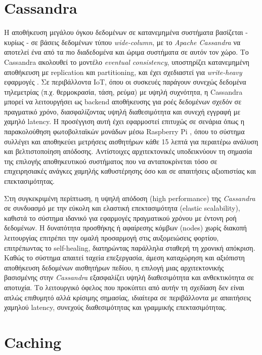 \section{Cassandra}

Η αποθήκευση μεγάλου όγκου δεδομένων σε κατανεμημένα συστήματα βασίζεται -
κυρίως - σε βάσεις δεδομένων τύπου \textit{wide-column}, με το \textit{Apache
	Cassandra} να αποτελεί ένα από τα πιο διαδεδομένα και ώριμα συστήματα σε αυτόν
τον χώρο. Το Cassandra ακολουθεί το μοντέλο \textit{eventual consistency},
υποστηρίζει κατανεμημένη αποθήκευση με replication και partitioning, και έχει
σχεδιαστεί για \textit{write-heavy} εφαρμογές \cite{cassandrawp}. Σε
περιβάλλοντα IoT, όπου οι συσκευές παράγουν συνεχώς δεδομένα τηλεμετρίας (π.χ.
θερμοκρασία, τάση, ρεύμα) με υψηλή συχνότητα, η Cassandra μπορεί να
λειτουργήσει ως backend αποθήκευσης για ροές δεδομένων σχεδόν σε πραγματικό
χρόνο, διασφαλίζοντας υψηλή διαθεσιμότητα και συνεχή εγγραφή με χαμηλό latency.
Η προσέγγιση αυτή έχει εφαρμοστεί επιτυχώς σε σενάρια όπως η παρακολούθηση
φωτοβολταϊκών μονάδων μέσω Raspberry Pi \cite{iotcassandra}, όπου το σύστημα
συλλέγει και αποθηκεύει μετρήσεις αισθητήρων κάθε 15 λεπτά για περαιτέρω
ανάλυση και βελτιστοποίηση απόδοσης. Αντίστοιχες αρχιτεκτονικές υποδεικνύουν τη
σημασία της επιλογής αποθηκευτικού συστήματος που να ανταποκρίνεται τόσο σε
επιχειρησιακές ανάγκες χαμηλής καθυστέρησης όσο και σε απαιτήσεις αξιοπιστίας
και επεκτασιμότητας.

Στη συγκεκριμένη περίπτωση, η υψηλή απόδοση (high performance) της
\textit{Cassandra} σε συνδυασμό με την εύκολη και ελαστική επεκτασιμότητα
(elastic scalability), καθιστά το σύστημα ιδανικό για εφαρμογές πραγματικού
χρόνου με έντονη ροή δεδομένων. Η δυνατότητα προσθήκης ή αφαίρεσης κόμβων
(nodes) χωρίς διακοπή λειτουργίας επιτρέπει την ομαλή προσαρμογή στις
αυξομειώσεις φορτίου, επιτρέπωντας το self-healing, διατηρώντας παράλληλα
σταθερή τη χρονική απόκριση. Καθώς το σύστημα απαιτεί ταχεία επεξεργασία, άμεση
καταχώρηση και αξιόπιστη αποθήκευση δεδομένων αισθητήρων πεδίου, η επιλογή μιας
αρχιτεκτονικής βασισμένης στην \textit{Cassandra} εξασφαλίζει υψηλή
διαθεσιμότητα και ανθεκτικότητα σε αποτυχία. Το λειτουργικό όφελος που
προκύπτει από αυτήν τη σχεδίαση δεν είναι απλώς επιθυμητό αλλά κρίσιμης
σημασίας, ιδιαίτερα σε περιβάλλοντα με απαιτήσεις χαμηλού latency, συνεχούς
διαθεσιμότητας και γραμμικής επεκτασιμότητας.

\section{Caching}

